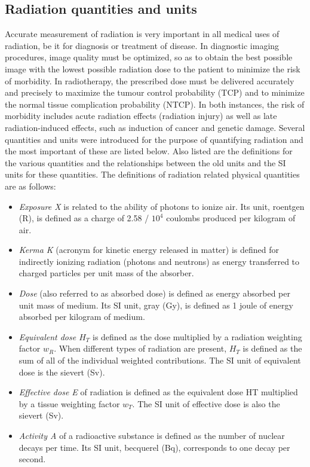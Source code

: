 \documentclass{article}
\begin{document}
\subsection*{Radiation quantities and units}
Accurate measurement of radiation is very important in all medical uses
of radiation, be it for diagnosis or treatment of disease. In diagnostic imaging procedures, image quality must be optimized, so as to obtain the best possible image with the lowest possible radiation dose to the patient to minimize the risk of morbidity. In radiotherapy, the prescribed dose must be delivered accurately and precisely to maximize the tumour control probability (TCP) and to minimize the normal tissue complication probability (NTCP). In both instances, the risk of morbidity includes acute radiation effects (radiation injury) as well as late radiation-induced effects, such as induction of cancer and genetic damage. Several quantities and units were introduced for the purpose of quantifying radiation and the most important of these are listed below. Also listed are the definitions for the various quantities and the relationships between the old units and the SI units for these quantities. The definitions of radiation related physical quantities are as follows:
\begin{itemize}
    \item \textit{Exposure X} is related to the ability of photons to ionize air. Its unit, roentgen (R), is defined as a charge of 2.58 / $10^{4}$ coulombs produced per kilogram of air.
    \item \textit{Kerma K} (acronym for kinetic energy released in matter) is defined for indirectly ionizing radiation (photons and neutrons) as energy transferred to charged particles per unit mass of the absorber.
    \item \textit{Dose} (also referred to as absorbed dose) is defined as energy absorbed per unit mass of medium. Its SI unit, gray (Gy), is defined as 1 joule of energy absorbed per kilogram of medium.
    \item \textit{Equivalent dose $H_T$} is defined as the dose multiplied by a radiation weighting factor $w_R$. When different types of radiation are present, $H_T$ is defined as the sum of all of the individual weighted contributions. The SI unit of equivalent dose is the sievert (Sv).
    \item \textit{Effective dose E} of radiation is defined as the equivalent dose HT multiplied by a tissue weighting factor $w_T$. The SI unit of effective dose is also the sievert (Sv).
    \item \textit{Activity A} of a radioactive substance is defined as the number of nuclear decays per time. Its SI unit, becquerel (Bq), corresponds to one decay per second.
\end{itemize}
\end{document}
